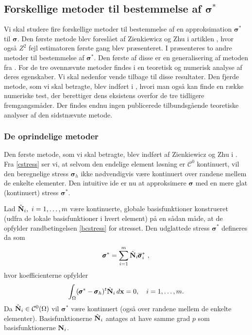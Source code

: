 \subsection{Forskellige metoder til bestemmelse af $\pmb{\sigma}^{\ast}$}
Vi skal studere fire forskellige metoder til bestemmelse af en
approksimation $\pmb{\sigma}^{\ast}$ til $\pmb{\sigma}$. Den første
metode blev foreslået af Zienkiewicz og Zhu i artiklen \cite{zz1},
hvor også $Z^2$ fejl estimatoren første gang blev præsenteret. I
\cite{zz2} præsenteres to andre metoder til bestemmelse af
$\pmb{\sigma}^{\ast}$. Den første af disse er en generalisering af
metoden fra \cite{zz1}. For de tre ovennævnte metoder findes i
\cite{zz2} en teoretisk og numerisk analyse af deres egenskaber. Vi
skal nedenfor vende tilbage til disse resultater. Den fjerde metode,
som vi skal betragte, blev indført i \cite{zz3}, hvori man også kan
finde en række numeriske test, der berettiger dens eksistens overfor
de tre tidligere fremgangsmåder. Der findes endnu ingen publicerede
tilbundsgående teoretiske analyser af den sidstnævnte metode.

\subsubsection{De oprindelige metoder}
Den første metode, som vi skal betragte, blev indført af Zienkiewicz
og Zhu i \cite{zz1}. Fra \eqref{cstress} ser vi, at selvom den
endelige element løsning er ${\mathcal C}^0$ kontinuert, vil den
beregnelige stress $\pmb{\sigma}_h$ ikke nødvendigvis være kontinuert
over randene mellem de enkelte elementer. Den intuitive ide er nu at
approksimere $\pmb\sigma$ med en mere glat (kontinuert) stress $\pmb{\sigma}^{\ast}$.

Lad $\hat{{\bf N}}_i, \ i=1,\ldots,m$ være kontinuerte, globale basisfunktioner konstrueret
(udfra de lokale basisfunktioner i hvert element) på en sådan måde, at
de opfylder randbetingelsen \eqref{bcstress} for stresset. Den
udglattede stress $\pmb{\sigma}^{\ast}$ defineres da som
\begin{equation}
  \pmb{\sigma}^{\ast} = \sum_{i=1}^m \hat{{\bf N}}_i 
  \overline{\pmb{\sigma}}^{\ast}_i \ , 
\end{equation}
hvor koefficienterne opfylder
\begin{equation}
  \int_{\Omega} (\pmb{\sigma}^{\ast} - \pmb{\sigma}_h)^t
  \hat{{\bf N}}_i\, d{\bf x}=0, \quad i=1,\ldots,m . 
\end{equation}
Da $\hat{{\bf N}}_i\in{\mathcal C}^0(\Omega )$ vil $\pmb{\sigma}^{\ast}$
være kontinuert (også over randene mellem de enkelte elementer).
Basisfunktionerne $\hat{{\bf N}}_i$ antages at have samme grad $p$
som basisfunktionerne ${\bf N}_i$.

